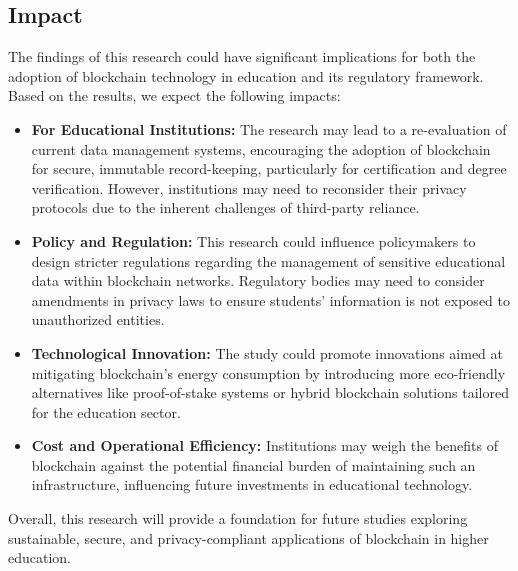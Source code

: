 \documentclass[a4paper, 12pt]{article}
\begin{document}
\subsection{Impact}
The findings of this research could have significant implications for both the adoption of blockchain technology in education and its regulatory framework. Based on the results, we expect the following impacts:
\begin{itemize}
    \item \textbf{For Educational Institutions:} The research may lead to a re-evaluation of current data management systems, encouraging the adoption of blockchain for secure, immutable record-keeping, particularly for certification and degree verification. However, institutions may need to reconsider their privacy protocols due to the inherent challenges of third-party reliance.
    \item \textbf{Policy and Regulation:} This research could influence policymakers to design stricter regulations regarding the management of sensitive educational data within blockchain networks. Regulatory bodies may need to consider amendments in privacy laws to ensure students' information is not exposed to unauthorized entities.
    \item \textbf{Technological Innovation:} The study could promote innovations aimed at mitigating blockchain's energy consumption by introducing more eco-friendly alternatives like proof-of-stake systems or hybrid blockchain solutions tailored for the education sector.
    \item \textbf{Cost and Operational Efficiency:} Institutions may weigh the benefits of blockchain against the potential financial burden of maintaining such an infrastructure, influencing future investments in educational technology.
\end{itemize}
Overall, this research will provide a foundation for future studies exploring sustainable, secure, and privacy-compliant applications of blockchain in higher education.


{}
\end{document}
